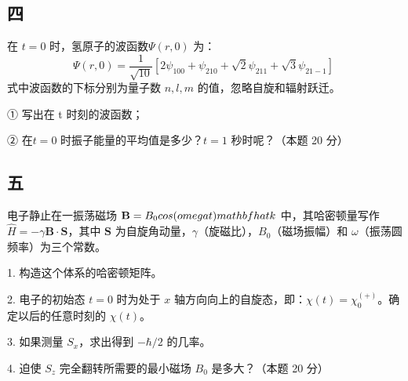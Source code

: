 \subsection{四}
在 $t = 0 $ 时，氢原子的波函数$\Psi(r, 0)$ 为：$$\Psi(r, 0) = \frac{1}{\sqrt{10}} \left[ 2\psi_{100} + \psi_{210} + \sqrt{2}\psi_{211} + \sqrt{3}\psi_{21-1} \right]~$$
式中波函数的下标分别为量子数 $ n, l, m $ 的值，忽略自旋和辐射跃迁。

①  写出在 t 时刻的波函数；

② 在$ t = 0$ 时振子能量的平均值是多少？$t = 1$ 秒时呢？（本题 20 分）

\subsection{五}
电子静止在一振荡磁场 $\mathbf{B} = B_0 \\cos(\\omega t) \\mathbf{\\hat{k}}
$ 中，其哈密顿量写作 $\hat{H} = - \gamma \mathbf{B} \cdot \mathbf{S}$，其中 $\mathbf{S}$ 为自旋角动量，$\gamma$（旋磁比），$B_0$（磁场振幅）和 $\omega$（振荡圆频率）为三个常数。

1. 构造这个体系的哈密顿矩阵。

2. 电子的初始态 $t = 0$ 时为处于 $x$ 轴方向向上的自旋态，即：$\chi (t) = \chi_{0}^{(+)}$。确定以后的任意时刻的 $\chi (t)$。

3. 如果测量 $S_x$，求出得到 $- \hbar / 2$ 的几率。

4. 迫使 $S_z$ 完全翻转所需要的最小磁场 $B_0$ 是多大？（本题 20 分）